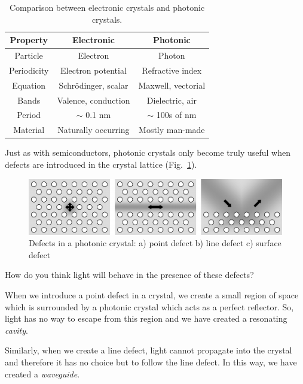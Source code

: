 \begin{table}[h!]
  \begin{center}
    \begin{tabular}{c|c|c} 
      \textbf{Property} & \textbf{Electronic} & \textbf{Photonic}\\
      \hline
      Particle & Electron & Photon \\
      Periodicity & Electron potential & Refractive index \\
      Equation & Schr\"{o}dinger, scalar & Maxwell, vectorial \\
      Bands & Valence, conduction & Dielectric, air \\
      Period & $\sim$ 0.1 nm & $\sim$ 100s of nm \\
      Material & Naturally occurring & Mostly man-made \\
    \end{tabular}
  \end{center}
  \caption{Comparison between electronic crystals and photonic crystals.}
  \label{tab-phot-cryst}
\end{table}


Just as with semiconductors, photonic crystals only become truly useful when defects are introduced in the crystal lattice (Fig.~\ref{fig-defects}).

\begin{figure}[H]
\centering
\includegraphics{symmetry/figures/2d_defects}
\caption{Defects in a photonic crystal: a) point defect b) line defect c) surface defect }
\label{fig-defects}
\end{figure}

\begin{cue}
  How do you think light will behave in the presence of these defects?
\end{cue}

When we introduce a point defect in a crystal, we create a small region of space which is surrounded by a photonic crystal which acts as a perfect reflector. So, light has no way to escape from this region and we have created a resonating \emph{cavity}.

Similarly, when we create a line defect, light cannot propagate into the crystal and therefore it has no choice but to follow the line defect. In this way, we have created a \emph{waveguide}.

